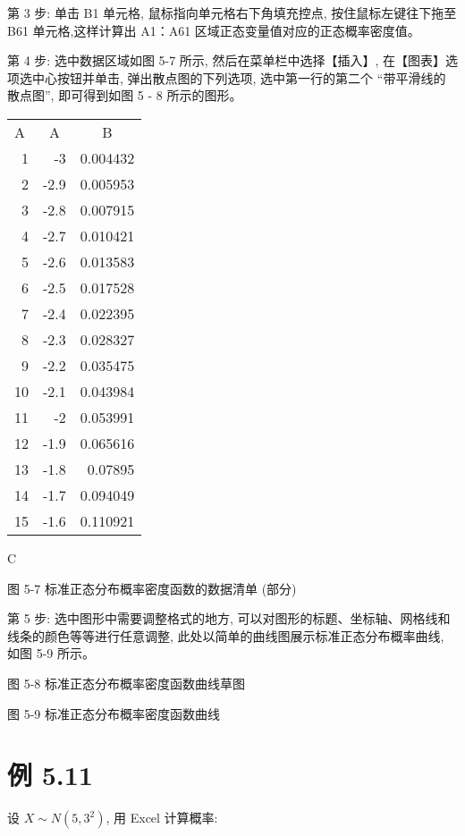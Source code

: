 \documentclass[10pt]{article}
\begin{document}
\begin{CJK*}{UTF8}{bsmi}
第 3 步: 单击 B1 单元格, 鼠标指向单元格右下角填充控点, 按住鼠标左键往下拖至 B61 单元格,这样计算出 A1：A61 区域正态变量值对应的正态概率密度值。

第 4 步: 选中数据区域如图 5-7 所示, 然后在菜单栏中选择【插入】, 在【图表】选项选中心按钮并单击, 弹出散点图的下列选项, 选中第一行的第二个 “带平滑线的散点图”, 即可得到如图 5 - 8 所示的图形。

\begin{center}
\begin{tabular}{|r|rr|}
\multicolumn{1}{l}{A} & \multicolumn{1}{c}{A} & \multicolumn{1}{c}{B} \\
\cline { 2 - 3 }
1 & -3 & 0.004432 \\
\hline
2 & -2.9 & 0.005953 \\
3 & -2.8 & 0.007915 \\
4 & -2.7 & 0.010421 \\
\hline
5 & -2.6 & 0.013583 \\
6 & -2.5 & 0.017528 \\
\hline
7 & -2.4 & 0.022395 \\
\hline
8 & -2.3 & 0.028327 \\
9 & -2.2 & 0.035475 \\
10 & -2.1 & 0.043984 \\
11 & -2 & 0.053991 \\
12 & -1.9 & 0.065616 \\
13 & -1.8 & 0.07895 \\
14 & -1.7 & 0.094049 \\
15 & -1.6 & 0.110921 \\
\hline
\end{tabular}
\end{center}

C

图 5-7 标准正态分布概率密度函数的数据清单 (部分)

第 5 步: 选中图形中需要调整格式的地方, 可以对图形的标题、坐标轴、网格线和线条的颜色等等进行任意调整, 此处以简单的曲线图展示标准正态分布概率曲线, 如图 5-9 所示。

\begin{center}
\end{center}

图 5-8 标准正态分布概率密度函数曲线草图

\begin{center}
\end{center}

图 5-9 标准正态分布概率密度函数曲线

\section*{例 5.11}
设 $X \sim N\left(5,3^{2}\right)$, 用 Excel 计算概率:


\end{CJK*}
\end{document}
